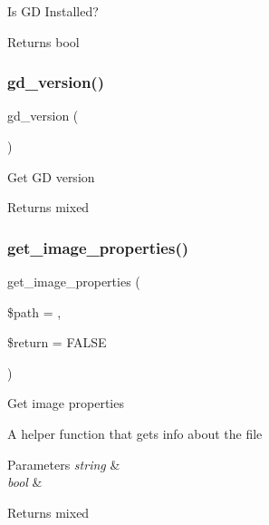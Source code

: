 Is GD Installed?

\begin{DoxyReturn}{Returns}
bool 
\end{DoxyReturn}
\mbox{\label{class_c_i___image__lib_a7d141f85d677d5e6db12020009569fde}} 
\subsubsection{\texorpdfstring{gd\+\_\+version()}{gd\_version()}}
{\footnotesize\ttfamily gd\+\_\+version (\begin{DoxyParamCaption}{ }\end{DoxyParamCaption})}

Get GD version

\begin{DoxyReturn}{Returns}
mixed 
\end{DoxyReturn}
\mbox{\label{class_c_i___image__lib_a91627ce4406f63c429ab13aab8f0e53c}} 
\subsubsection{\texorpdfstring{get\+\_\+image\+\_\+properties()}{get\_image\_properties()}}
{\footnotesize\ttfamily get\+\_\+image\+\_\+properties (\begin{DoxyParamCaption}\item[{}]{\$path = {\ttfamily \textquotesingle{}\textquotesingle{}},  }\item[{}]{\$return = {\ttfamily FALSE} }\end{DoxyParamCaption})}

Get image properties

A helper function that gets info about the file


\begin{DoxyParams}{Parameters}
{\em string} & \\
\hline
{\em bool} & \\
\hline
\end{DoxyParams}
\begin{DoxyReturn}{Returns}
mixed 
\end{DoxyReturn}
\mbox{\label{class_c_i___image__lib_a1a222111448274ffca4e59d8a473c5fc}} 
